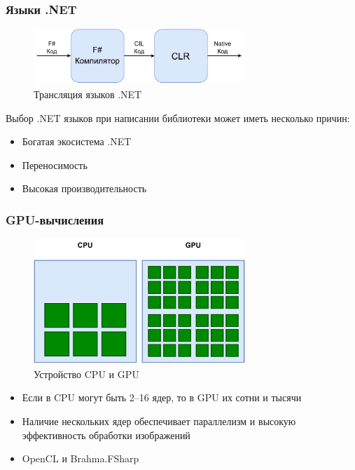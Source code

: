 \documentclass[aspectratio=169]{beamer}
\begin{document}
\begin{frame}
  \frametitle{Языки .NET}
  \begin{minipage}[m]{0.6\linewidth}
        \begin{figure}
            \centering
            \includegraphics[width=8.0cm]{pictures/CIL.pdf}
            \caption{Трансляция языков .NET}
            \label{fig:cil}
        \end{figure}
    \end{minipage}\hfill
    \begin{minipage}[m]{0.4\linewidth}
        Выбор .NET языков при написании библиотеки может иметь несколько причин:
    \begin{itemize}
        \item Богатая экосистема .NET
        \item Переносимость
        \item Высокая производительность
    \end{itemize}
    \end{minipage}
\end{frame}

\begin{frame}
  \frametitle{GPU-вычисления}
  \begin{minipage}[m]{0.6\linewidth}
        \begin{figure}
            \centering
            \includegraphics[width=8.0cm]{pictures/GPU_vs_CPU.pdf}
            \caption{Устройство CPU и GPU}
            \label{fig:cpuvsgpu}
        \end{figure}
    \end{minipage}\hfill
    \begin{minipage}[m]{0.4\linewidth}
        \begin{itemize}
            \item Если в CPU могут быть 2--16 ядер, то в GPU их сотни и тысячи
            \item Наличие нескольких ядер обеспечивает параллелизм и высокую эффективность обработки изображений
            \item OpenCL и Brahma.FSharp
        \end{itemize}
    \end{minipage}
\end{frame}
\end{document}
